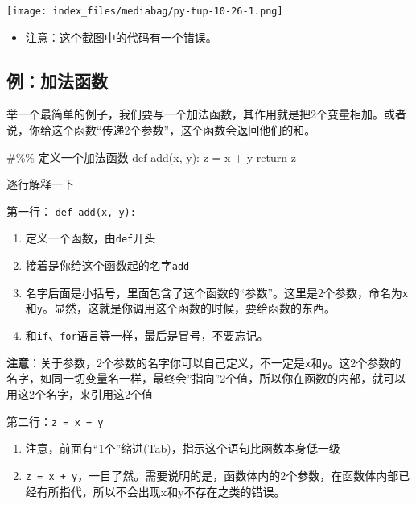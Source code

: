 \documentclass[
  letterpaper,
  DIV=11,
  numbers=noendperiod]{scrreprt}
\newenvironment{Shaded}{\begin{snugshade}}{\end{snugshade}}
\newcommand{\CommentTok}[1]{\textcolor[rgb]{0.37,0.37,0.37}{#1}}
\newcommand{\ControlFlowTok}[1]{\textcolor[rgb]{0.00,0.23,0.31}{#1}}
\newcommand{\KeywordTok}[1]{\textcolor[rgb]{0.00,0.23,0.31}{#1}}
\newcommand{\NormalTok}[1]{\textcolor[rgb]{0.00,0.23,0.31}{#1}}
\newcommand{\OperatorTok}[1]{\textcolor[rgb]{0.37,0.37,0.37}{#1}}
\providecommand{\tightlist}{%
  \setlength{\itemsep}{0pt}\setlength{\parskip}{0pt}}\usepackage{longtable,booktabs,array}
\begin{document}
\texttt{[image: index\_files/mediabag/py-tup-10-26-1.png]}

\begin{itemize}
\tightlist
\item
  注意：这个截图中的代码有一个错误。
\end{itemize}

\hypertarget{ux4f8bux52a0ux6cd5ux51fdux6570}{%
\subsection{例：加法函数}\label{ux4f8bux52a0ux6cd5ux51fdux6570}}

举一个最简单的例子，我们要写一个加法函数，其作用就是把2个变量相加。或者说，你给这个函数``传递2个参数''，这个函数会返回他们的和。

\begin{Shaded}
\begin{Highlighting}[]
\CommentTok{\#\%\% 定义一个加法函数}
\KeywordTok{def}\NormalTok{ add(x, y):}
\NormalTok{    z }\OperatorTok{=}\NormalTok{ x }\OperatorTok{+}\NormalTok{ y}
    \ControlFlowTok{return}\NormalTok{ z}
\end{Highlighting}
\end{Shaded}

逐行解释一下

第一行： \texttt{def\ add(x,\ y):}

\begin{enumerate}
\def\labelenumi{\arabic{enumi}.}
\tightlist
\item
  定义一个函数，由\texttt{def}开头
\item
  接着是你给这个函数起的名字\texttt{add}
\item
  名字后面是小括号，里面包含了这个函数的``参数''。这里是2个参数，命名为\texttt{x}和\texttt{y}。显然，这就是你调用这个函数的时候，要给函数的东西。
\item
  和\texttt{if}、\texttt{for}语言等一样，最后是冒号，不要忘记。
\end{enumerate}

\textbf{注意}：关于参数，2个参数的名字你可以自己定义，不一定是\texttt{x}和\texttt{y}。这2个参数的名字，如同一切变量名一样，最终会''指向''2个值，所以你在函数的内部，就可以用这2个名字，来引用这2个值

第二行：\texttt{z\ =\ x\ +\ y}

\begin{enumerate}
\def\labelenumi{\arabic{enumi}.}
\tightlist
\item
  注意，前面有``1个''缩进(Tab)，指示这个语句比函数本身低一级
\item
  \texttt{z\ =\ x\ +\ y}，一目了然。需要说明的是，函数体内的2个参数，在函数体内部已经有所指代，所以不会出现x和y不存在之类的错误。
\end{enumerate}
\end{document}
